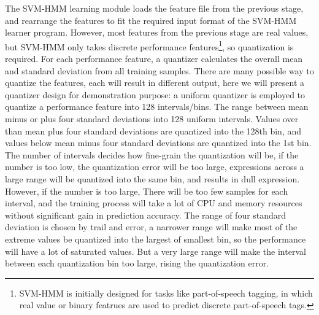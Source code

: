The SVM-HMM learning module loads the feature file from the previous stage, and rearrange the features to fit the required input format of the SVM-HMM learner program. However, most features from the previous stage are real values, but SVM-HMM only takes discrete performance features\footnote{SVM-HMM is initially designed for tasks like part-of-speech tagging, in which real value or binary featrues are used to predict discrete part-of-speech tags.}, so quantization is required. For each performance feature, a quantizer calculates the overall mean and standard deviation from all training samples. There are many possible way to quantize the features, each will result in different output, here we will present a quantizer design for demonstration purpose: a uniform quantizer is employed to quantize a performance feature into 128 intervals/bins. The range between mean minus or plus four standard deviations into 128 uniform intervals. Values over than mean plus four standard deviations are quantized into the 128th bin, and values below mean minus four standard deviations are quantized into the 1st bin. The number of intervals decides how fine-grain the quantization will be, if the number is too low, the quantization error will be too large, expressions across a large range will be quantized into the same bin, and results in dull expression. However, if the number is too large, There will be too few samples for each interval, and the training process will take a lot of CPU and memory resources without significant gain in prediction accuracy. The range of four standard deviation is chosen by trail and error, a narrower range will make most of the extreme values be quantized into the largest of smallest bin, so the performance will have a lot of saturated values. But a very large range will make the interval between each quantization bin too large, rising the quantization error. %

